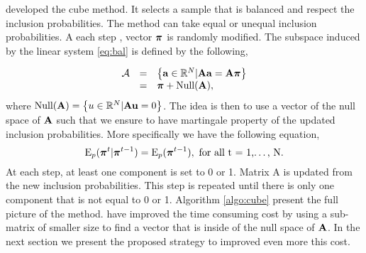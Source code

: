 \documentclass[12pt,english]{article}\usepackage[]{graphicx}\usepackage{xcolor}
\begin{document}
\cite{dev:til:04a} developed the cube method. It selects a sample that is balanced and respect the inclusion probabilities. The method can take equal or unequal inclusion probabilities. A each step , vector $\boldsymbol{\pi}$ is randomly modified. The subspace induced by the linear system \eqref{eq:bal} is defined by the following,

$$\begin{array}{cll}\mathcal{A} &=& \left\{ {\bf a} \in \mathbb{R}^N | {\bf A}{\bf a} = {\bf A}\boldsymbol{\pi} \right\}\\
&=& \boldsymbol{\pi} + \text{Null}({\bf A}),
\end{array}
$$
where $\text{Null}({\bf A}) = \left\{u \in \mathbb{R}^N | {\bf A}{\bf u} = 0 \right\}$. The idea is then to use a vector of the null space of ${\bf A}$ such that we ensure to have martingale property of the updated inclusion probabilities. More specifically we have the following equation,
$$ {\rm E}_p(\boldsymbol{\pi}^t | \boldsymbol{\pi}^{t-1}) = {\rm E}_p(\boldsymbol{\pi}^{t-1}), \text{ for all t = 1,\dots, N}.$$
At each step, at least one component is set to 0 or 1. Matrix A is updated from the new inclusion probabilities. This step is repeated until there is only one component that is not equal to 0 or 1. Algorithm \ref{algo:cube} present the full picture of the method. \cite{cha:til:06} have improved the time consuming cost by using a sub-matrix of smaller size to find a vector that is inside of the null space of ${\bf A}$. In the next section we present the proposed strategy to improved even more this cost.
\end{document}

